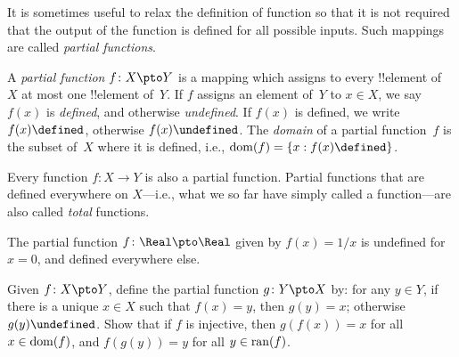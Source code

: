 \documentclass[../../../include/open-logic-section]{subfiles}
\begin{document}


\begin{explain}
It is sometimes useful to relax the definition of function so that it
is not required that the output of the function is defined for all
possible inputs. Such mappings are called \emph{partial functions}.
\end{explain}

\begin{defn}
A \emph{partial function} $f \colon X \pto Y$ is a mapping which
assigns to every !!{element} of~$X$ at most one !!{element} of~$Y$.
If $f$ assigns an element of~$Y$ to $x \in X$, we say $f(x)$ is
\emph{defined}, and otherwise \emph{undefined}. If $f(x)$ is defined,
we write $f(x) \defined$, otherwise $f(x) \undefined$. The
\emph{domain} of a partial function~$f$ is the subset of~$X$ where it
is defined, i.e., $\dom{f} = \Setabs{x}{f(x) \defined}$.
\end{defn}

\begin{ex}
Every function $f\colon X \to Y$ is also a partial function. Partial
functions that are defined everywhere on $X$---i.e., what we so far
have simply called a function---are also called \emph{total}
functions.
\end{ex}

\begin{ex}
The partial function $f \colon \Real \pto \Real$ given by $f(x) = 1/x$
is undefined for $x = 0$, and defined everywhere else.
\end{ex}

\begin{prob}
Given $f\colon X \pto Y$, define the partial function $g\colon Y \pto
X$ by: for any $y \in Y$, if there is a unique $x \in X$ such that
$f(x) = y$, then $g(y) = x$; otherwise $g(y) \undefined$.  Show that
if $f$ is injective, then $g(f(x)) = x$ for all $x \in \mathrm{dom}(f)$, and
$f(g(y)) = y$ for all $y \in \mathrm{ran}(f)$.
\end{prob}
\end{document}
